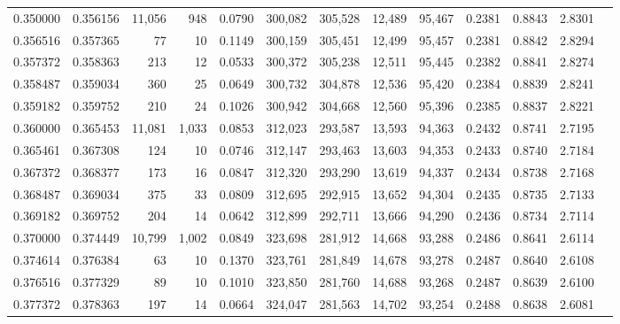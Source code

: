 \begin{tabular}{rrrrrrrrrrrrr}
0.350000 & 0.356156 & 11,056 &   948 &                                     0.0790 & 300,082 & 305,528 &  12,489 &  95,467 & 0.2381 & 0.8843 & 2.8301 \\
0.356516 & 0.357365 &     77 &    10 &                                     0.1149 & 300,159 & 305,451 &  12,499 &  95,457 & 0.2381 & 0.8842 & 2.8294 \\
0.357372 & 0.358363 &    213 &    12 &                                     0.0533 & 300,372 & 305,238 &  12,511 &  95,445 & 0.2382 & 0.8841 & 2.8274 \\
0.358487 & 0.359034 &    360 &    25 &                                     0.0649 & 300,732 & 304,878 &  12,536 &  95,420 & 0.2384 & 0.8839 & 2.8241 \\
0.359182 & 0.359752 &    210 &    24 &                                     0.1026 & 300,942 & 304,668 &  12,560 &  95,396 & 0.2385 & 0.8837 & 2.8221 \\
0.360000 & 0.365453 & 11,081 & 1,033 &                                     0.0853 & 312,023 & 293,587 &  13,593 &  94,363 & 0.2432 & 0.8741 & 2.7195 \\
0.365461 & 0.367308 &    124 &    10 &                                     0.0746 & 312,147 & 293,463 &  13,603 &  94,353 & 0.2433 & 0.8740 & 2.7184 \\
0.367372 & 0.368377 &    173 &    16 &                                     0.0847 & 312,320 & 293,290 &  13,619 &  94,337 & 0.2434 & 0.8738 & 2.7168 \\
0.368487 & 0.369034 &    375 &    33 &                                     0.0809 & 312,695 & 292,915 &  13,652 &  94,304 & 0.2435 & 0.8735 & 2.7133 \\
0.369182 & 0.369752 &    204 &    14 &                                     0.0642 & 312,899 & 292,711 &  13,666 &  94,290 & 0.2436 & 0.8734 & 2.7114 \\
0.370000 & 0.374449 & 10,799 & 1,002 &                                     0.0849 & 323,698 & 281,912 &  14,668 &  93,288 & 0.2486 & 0.8641 & 2.6114 \\
0.374614 & 0.376384 &     63 &    10 &                                     0.1370 & 323,761 & 281,849 &  14,678 &  93,278 & 0.2487 & 0.8640 & 2.6108 \\
0.376516 & 0.377329 &     89 &    10 &                                     0.1010 & 323,850 & 281,760 &  14,688 &  93,268 & 0.2487 & 0.8639 & 2.6100 \\
0.377372 & 0.378363 &    197 &    14 &                                     0.0664 & 324,047 & 281,563 &  14,702 &  93,254 & 0.2488 & 0.8638 & 2.6081 \\

\end{tabular}
